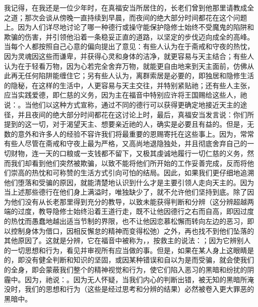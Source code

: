 我记得，在我还是一位少年时，在真福安当所居住的，长老们曾到他那里请教成全之道；那次会谈从傍晚一直持续到早晨，而夜间的绝大部分时间都花在这个问题上。因为人们详尽地讨论了哪一种德行或操守能保护隐修士始终不受魔鬼的陷阱和欺骗的伤害，并引领他沿着一条稳妥正直的道路，以坚定的步伐迈向成全的高峰。当每个人都按照自己心意的偏向提出了意见：有些人认为在于斋戒和守夜的热忱，因为灵魂因这些而谦卑，并获得心灵和身体的洁净，就更容易与天主结合；有些人认为在于轻看万物，因为心若完全舍弃万物，就能更自由地来到天主面前，仿佛从此再无任何陷阱能缠住它；另有些人认为，离群索居是必要的，即独居和隐修生活的隐秘，在这样的生活中，人更容易与天主交往，并特别紧贴祂；还有些人主张，应当实践爱德，即仁慈的义务，因为主在福音中特别应许将王国赐给这些人，祂说：。当他们以这种方式宣称，通过不同的德行可以获得更确定地接近天主的途径，并且夜间的绝大部分时间都花在这讨论上时，最后，真福安当发言说：你们所提到的这一切，对于渴望天主、想要亲近祂的人，确实是必要且有益的。但是，无数的意外和许多人的经验不容许我们将最重要的恩赐寄托在这些事上。因为，常常有些人尽管在斋戒和守夜上最为严格，又高尚地退隐独处，并且彻底舍弃自己的一切财物，连一天的口粮或一支钱都不留下，又极其虔诚地履行一切仁慈的义务，然而我们却看到他们突然被欺骗，以致不能将他们所开始的工作妥善完成，反而将他们崇高的热忱和可称赞的生活方式引向可怕的结局。因此，如果我们更仔细地追溯他们堕落和受骗的原因，就能清楚地认识到什么才是主要引领人走向天主的。因为当上述那些德行在他们身上满溢时，唯独缺少了，就不允许他们坚持到底。除了因为他们没有从长老那里得到充分的教导，以致未能获得判断和分辨（这分辨超越两端的过度，教导隐修士始终沿着王道行走，既不让他因德行之右而自高，即因过度的热忱而愚蠢地越出适当节制的界限，也不让他因恋慕松懈而转向左边的恶习，即以控制身体为借口，因相反懈怠的精神而变得松弛）之外，再也找不到他们坠落的其他原因了。这就是分辨，它在福音中被称为，，按救主的说法：；因为它辨别人的一切思想和行为，看见并审视所有应当做的事。但是，如果在某人身上这眼睛是的，即没有健全判断和知识的坚固，或因某种错误和自以为是而受骗，就会使我们的全身，即会蒙蔽我们整个的精神视觉和行为，使它们陷入恶习的黑暗和纷扰的阴霾中。因为，祂说：。因为无人怀疑，当我们内心的判断出错，被无知的黑暗所淹没时，我们的思想和行为（这些是经过思考和分辨的结果）必然被卷入更大罪恶的黑暗中。\par

